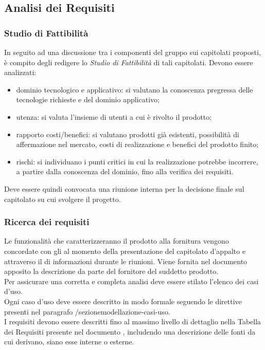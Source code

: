 \subsection{Analisi dei Requisiti}
\subsubsection{Studio di Fattibilità}
In seguito ad una discussione tra i componenti del gruppo sui capitolati proposti, è compito degli \Analisti{} redigere lo \textit{Studio di Fattibilità} di tali capitolati. Devono essere analizzati:
\begin{itemize}
	\item dominio tecnologico e applicativo: si valutano la conoscenza pregressa delle tecnologie richieste e del dominio applicativo;
	\item utenza: si valuta l'insieme di utenti a cui è rivolto il prodotto;
	\item rapporto costi/benefici: si valutano prodotti già esistenti, possibilità di affermazione nel mercato, costi di realizzazione e benefici del prodotto finito;
	\item rischi: si individuano i punti critici in cui la realizzazione potrebbe incorrere, a partire dalla conoscenza del dominio, fino alla verifica dei requisiti.
\end{itemize}
Deve essere quindi convocata una riunione interna per la decisione finale sul capitolato su cui svolgere il progetto.

\subsubsection{Ricerca dei requisiti}
Le funzionalità che caratterizzeranno il prodotto alla fornitura vengono concordate con gli  al momento della presentazione del capitolato d'appalto e attraverso il  di informazioni durante le riunioni. Viene fornita nel documento apposito \AnalisiDeiRequisiti{} la descrizione da parte del fornitore del suddetto prodotto.\\
Per assicurare una corretta e completa analisi deve essere stilato l'elenco dei casi d'uso.\\
Ogni caso d'uso deve essere descritto in modo formale seguendo le direttive presenti nel paragrafo /sezione{modellazione-casi-uso}.\\
I requisiti devono essere descritti fino al massimo livello di dettaglio nella Tabella dei Requisiti presente nel documento \AnalisiDeiRequisiti, includendo una descrizione delle fonti da cui derivano, siano esse interne o esterne.

